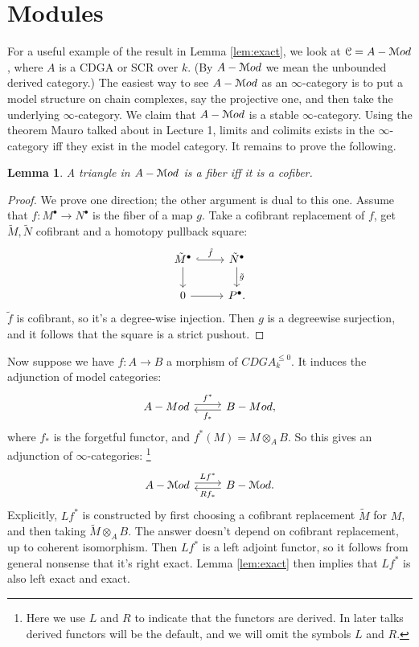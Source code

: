 \documentclass[10pt,a4paper,reqno,oneside]{book} %
\theoremstyle{plain}
\newtheorem{lem}[thm]{Lemma}
\theoremstyle{definition}
\theoremstyle{remark}
\numberwithin{equation}{section}
\begin{document}
\section{Modules}
\label{sect:modules}

For a useful example of the result in Lemma \ref{lem:exact}, we look at $\mathcal C = A-\mathcal M od$, where $A$ is a CDGA or SCR over $k$.
(By $A-\mathcal M od$ we mean the unbounded derived category.) The easiest way
to see $A-\mathcal M od$ as an $\infty$-category is to put a model structure on chain complexes, say the projective one, and then
take the underlying $\infty$-category.
We claim that $A-\mathcal M od$ is a stable $\infty$-category. Using the theorem
Mauro talked about in Lecture 1, limits and colimits exists in the $\infty$-category iff they exist in the model category.
 It remains to prove the following.

\begin{lem}
A triangle in $A-\mathcal M od$ is a fiber iff it is a cofiber.
\end{lem}
\begin{proof}
We prove one direction; the other argument is dual to this one. Assume that $f:M^{\bullet} \to N^{\bullet}$ 
is the fiber of a map $g$. Take a cofibrant replacement of $f$, get $\tilde M, \tilde N$ cofibrant and a homotopy
pullback square:
\[
\begin{tikzcd}
\tilde M^{\bullet}\arrow[hook]{r}{\tilde f}\arrow{d} & \tilde N^{\bullet}\arrow{d}{\tilde g} \\
0\arrow{r}  & P^{\bullet} .
\end{tikzcd}
\]
$\tilde f$ is cofibrant, so it's a degree-wise injection. Then $g$ is a degreewise surjection, and it follows that the 
square is a strict pushout. 
\end{proof}

Now suppose we have $f: A \to B$ a morphism of $CDGA_k^{\leq 0}$. It induces the adjunction of model categories:
\[
\begin{tikzcd}
A-Mod\arrow[shift left]{r}{f^*} & B-Mod\arrow[shift left]{l}{f_*},
\end{tikzcd}
\]
where $f_*$ is the forgetful functor, and $f^*(M) = M \otimes_A B$. So this gives an adjunction of $\infty$-categories:
\footnote{Here we use $L$ and $R$ to indicate that the functors are derived.
In later talks derived functors will be the default, and we will omit the symbols $L$ and $R$.}
\[
\begin{tikzcd}
\label{tikz:adjunction}
A-\cM od\arrow[shift left]{r}{Lf^*} & B-\cM od\arrow[shift left]{l}{Rf_*}.
\end{tikzcd}
\]
Explicitly, $Lf^*$ is constructed by first choosing a cofibrant replacement $\tilde M$ for $M$, 
and then taking $\tilde M \otimes_A B$. The
answer doesn't depend on cofibrant replacement, up to coherent isomorphism. Then $Lf^*$ is a left adjoint
functor, so it follows from general nonsense that it's right exact. Lemma \ref{lem:exact} then implies that $Lf^*$
is also left exact and exact.
\end{document}
